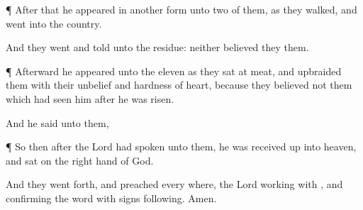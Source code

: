 {\par }{\PP {}¶
After
that he
appeared
in
another
form unto
two
of
them, as they
walked, and
went
into the
country.

And
they
went and
told
{} unto the
residue:
neither believed
they
them.


\par }{\PP {}¶
Afterward he
appeared unto the
eleven as
they sat at
meat,
and
upbraided them with
their
unbelief
and hardness of
heart,
because they
believed
not them
which had
seen
him after he was
risen.

And he
said unto
them,
{}





\par }{\PP {}¶
So
then
after the
Lord had
spoken unto
them, he was received
up
into
heaven,
and
sat
on the right
hand of
God.

And
they went
forth, and
preached every
where, the
Lord working
with
{},
and
confirming the
word
with
signs
following.
Amen.


\par }